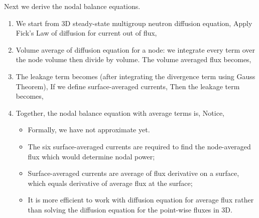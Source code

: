\documentclass{school-22.211-notes}
\begin{document}
Next we derive the nodal balance equations. 
\begin{enumerate}
\item We start from 3D steady-state multigroup neutron diffusion equation, 
  Apply Fick's Law of diffusion for current out of flux, 

\item Volume average of diffusion equation for a node: we integrate every term over the node volume then divide by volume. The volume averaged flux becomes, 

\item The leakage term becomes (after integrating the divergence term using Gauss Theorem), 
  If we define surface-averaged currents, 
  Then the leakage term becomes, 
 
\item Together, the nodal balance equation with average terms is, 
  Notice, 
  \begin{itemize}
    \item Formally, we have not approximate yet. 
    \item The six surface-averaged currents are required to find the node-averaged flux which would determine nodal power;
    \item Surface-averaged currents are average of flux derivative on a surface, which equals derivative of average flux at the surface; 
    \item It is more efficient to work with diffusion equation for average flux rather than solving the diffusion equation for the point-wise fluxes in 3D. 
  \end{itemize}
\end{enumerate}
\end{document}
